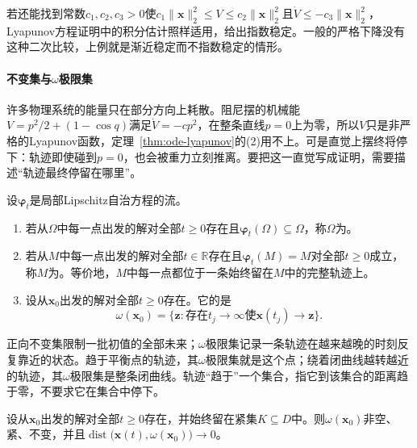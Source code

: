 若还能找到常数$c_1,c_2,c_3>0$使$c_1\|\bm x\|_2^2\leq V\leq c_2\|\bm x\|_2^2$且$\dot V\leq-c_3\|\bm x\|_2^2$，Lyapunov方程证明中的积分估计照样适用，给出指数稳定。一般的严格下降没有这种二次比较，上例就是渐近稳定而不指数稳定的情形。

\paragraph{不变集与$\omega$极限集}
许多物理系统的能量只在部分方向上耗散。阻尼摆的机械能$V=p^2/2+(1-\cos q)$满足$\dot V=-cp^2$，在整条直线$p=0$上为零，所以$V$只是非严格的Lyapunov函数，定理~\ref{thm:ode-lyapunov}的(2)用不上。可是直觉上摆终将停下：轨迹即使碰到$p=0$，也会被重力立刻推离。要把这一直觉写成证明，需要描述“轨迹最终停留在哪里”。

\begin{definition}
  \label{def:ode-invariant-limit-sets}
  \label{def:dynamical-invariant-limit-sets}
  设$\bm\varphi_t$是局部Lipschitz自治方程的流。
  \begin{enumerate}
    \item 若从$\Omega$中每一点出发的解对全部$t\geq0$存在且$\bm\varphi_t(\Omega)\subseteq\Omega$，称$\Omega$为。
    \item 若从$M$中每一点出发的解对全部$t\in\mathbb R$存在且$\bm\varphi_t(M)=M$对全部$t\geq0$成立，称$M$为。等价地，$M$中每一点都位于一条始终留在$M$中的完整轨迹上。
    \item 设从$\bm x_0$出发的解对全部$t\geq0$存在。它的是
    \[
      \omega(\bm x_0)=\bigl\{\bm z:\text{存在}t_j\to\infty\text{使}\bm x(t_j)\to\bm z\bigr\}.
    \]
  \end{enumerate}
\end{definition}

正向不变集限制一批初值的全部未来；$\omega$极限集记录一条轨迹在越来越晚的时刻反复靠近的状态。趋于平衡点的轨迹，其$\omega$极限集就是这个点；绕着闭曲线越转越近的轨迹，其$\omega$极限集是整条闭曲线。轨迹“趋于”一个集合，指它到该集合的距离趋于零，不要求它在集合中停下。

\begin{lemma}
  \label{lem:ode-omega-limit}
  设从$\bm x_0$出发的解对全部$t\geq0$存在，并始终留在紧集$K\subseteq D$中。则$\omega(\bm x_0)$非空、紧、不变，并且$\operatorname{dist}\bigl(\bm x(t),\omega(\bm x_0)\bigr)\to0$。
\end{lemma}

